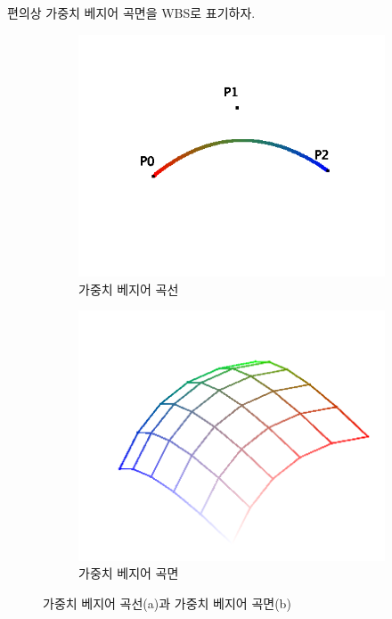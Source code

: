 \documentclass{gshs_thesis}
\theoremstyle{theorem}
\theoremstyle{lemma}
\theoremstyle{definition}
\begin{document}
편의상 가중치 베지어 곡면을 WBS로 표기하자.
\begin{figure}[h]
	\centering
	\begin{subfigure}[b]{.45\textwidth}
		\centering
		\includegraphics[width=\textwidth]{image/WBC}
		\caption{가중치 베지어 곡선}
	\end{subfigure}
	\hfill
	\begin{subfigure}[b]{.45\textwidth}
		\centering
		\includegraphics[width=\textwidth]{image/WBS}
		\caption{가중치 베지어 곡면}
	\end{subfigure}
	\caption{가중치 베지어 곡선(a)과 가중치 베지어 곡면(b)}
\end{figure}
\end{document}

